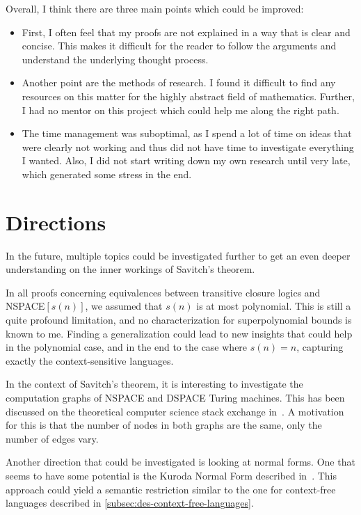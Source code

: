 Overall, I think there are three main points which could be improved:
\begin{itemize}
    \setlength\itemsep{0.2em}
    \item First, I often feel that my proofs are not explained in a way that is clear and concise.
    This makes it difficult for the reader to follow the arguments and understand the underlying thought process.
    \item Another point are the methods of research.
    I found it difficult to find any resources on this matter for the highly abstract field of mathematics.
    Further, I had no mentor on this project which could help me along the right path.
    \item The time management was suboptimal, as I spend a lot of time on ideas that were clearly not working and thus did not have time to investigate everything I wanted.
    Also, I did not start writing down my own research until very late, which generated some stress in the end.
\end{itemize}

\section{Directions}\label{sec:directions}
In the future, multiple topics could be investigated further to get an even deeper understanding on the inner workings of Savitch's theorem.

In all proofs concerning equivalences between transitive closure logics and NSPACE$[s(n)]$, we assumed that $s(n)$ is at most polynomial.
This is still a quite profound limitation, and no characterization for superpolynomial bounds is known to me.
Finding a generalization could lead to new insights that could help in the polynomial case, and in the end to the case where $s(n) = n$, capturing exactly the context-sensitive languages.

In the context of Savitch's theorem, it is interesting to investigate the computation graphs of NSPACE and DSPACE Turing machines.
This has been discussed on the theoretical computer science stack exchange in~\cite{Barak2010}.
A motivation for this is that the number of nodes in both graphs are the same, only the number of edges vary.

Another direction that could be investigated is looking at normal forms.
One that seems to have some potential is the Kuroda Normal Form described in~\cite{Kuroda1964}.
This approach could yield a semantic restriction similar to the one for context-free languages described in \cref{subsec:des-context-free-languages}.

